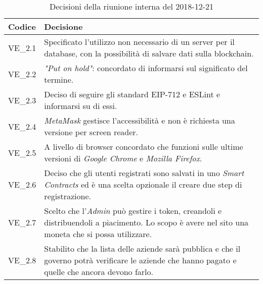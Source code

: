 	\begin{longtable}{ >{\centering}p{} >{}p{}}
		\caption{Decisioni della riunione interna del 2018-12-21}\\	
		\rowcolorhead
		\textbf{\color{white}Codice} 
		& \centering\textbf{\color{white}Decisione} 
		\tabularnewline 
		\endfirsthead
		VE\_2.1 & Specificato l'utilizzo non necessario di un server per il database,
				con la possibilità di salvare dati sulla blockchain.
		
		\tabularnewline 
		VE\_2.2 & \textit{"Put on hold"}: concordato di informarsi sul significato del termine.
		
		\tabularnewline 
		VE\_2.3 & Deciso di seguire gli standard EIP-712 e ESLint e informarsi su di essi.
	
		\tabularnewline 
		VE\_2.4 & \textit{MetaMask} gestisce l'accessibilità e non è richiesta una versione
				per screen reader\glo{}.
		
		\tabularnewline 
		VE\_2.5 & A livello di browser concordato che funzioni sulle ultime versioni 
				di \textit{Google Chrome} e \textit{Mozilla Firefox}.
		
		\tabularnewline 
		VE\_2.6 & Deciso che gli utenti registrati sono salvati in uno \textit{Smart 
				Contracts} ed è una scelta opzionale il creare due step di registrazione.
				
		\tabularnewline
		VE\_2.7 & Scelto che l'\textit{Admin} può gestire i token\glo{}, creandoli 
				e distribuendoli a piacimento. Lo scopo è avere nel sito una moneta che si 
				possa utilizzare.
				
		\tabularnewline
		VE\_2.8 & Stabilito che la lista delle aziende sarà pubblica e che il governo potrà 
				verificare le aziende che hanno pagato e quelle che ancora devono farlo.
		
	\end{longtable}

